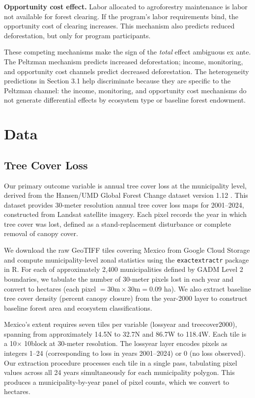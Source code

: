 \documentclass[12pt]{article}
\begin{document}
\textbf{Opportunity cost effect.} Labor allocated to agroforestry maintenance is labor not available for forest clearing. If the program's labor requirements bind, the opportunity cost of clearing increases. This mechanism also predicts reduced deforestation, but only for program participants.

These competing mechanisms make the sign of the \textit{total} effect ambiguous ex ante. The Peltzman mechanism predicts increased deforestation; income, monitoring, and opportunity cost channels predict decreased deforestation. The heterogeneity predictions in Section 3.1 help discriminate because they are specific to the Peltzman channel: the income, monitoring, and opportunity cost mechanisms do not generate differential effects by ecosystem type or baseline forest endowment.


\section{Data}

\subsection{Tree Cover Loss}

Our primary outcome variable is annual tree cover loss at the municipality level, derived from the Hansen/UMD Global Forest Change dataset version 1.12 \citep{hansen2013high}. This dataset provides 30-meter resolution annual tree cover loss maps for 2001--2024, constructed from Landsat satellite imagery. Each pixel records the year in which tree cover was lost, defined as a stand-replacement disturbance or complete removal of canopy cover.

We download the raw GeoTIFF tiles covering Mexico from Google Cloud Storage and compute municipality-level zonal statistics using the \texttt{exactextractr} package in R. For each of approximately 2,400 municipalities defined by GADM Level 2 boundaries, we tabulate the number of 30-meter pixels lost in each year and convert to hectares (each pixel $= 30\text{m} \times 30\text{m} = 0.09$ ha). We also extract baseline tree cover density (percent canopy closure) from the year-2000 layer to construct baseline forest area and ecosystem classifications.

Mexico's extent requires seven tiles per variable (lossyear and treecover2000), spanning from approximately 14.5\textdegree N to 32.7\textdegree N and 86.7\textdegree W to 118.4\textdegree W. Each tile is a 10\textdegree $\times$ 10\textdegree block at 30-meter resolution. The lossyear layer encodes pixels as integers 1--24 (corresponding to loss in years 2001--2024) or 0 (no loss observed). Our extraction procedure processes each tile in a single pass, tabulating pixel values across all 24 years simultaneously for each municipality polygon. This produces a municipality-by-year panel of pixel counts, which we convert to hectares.
\end{document}
